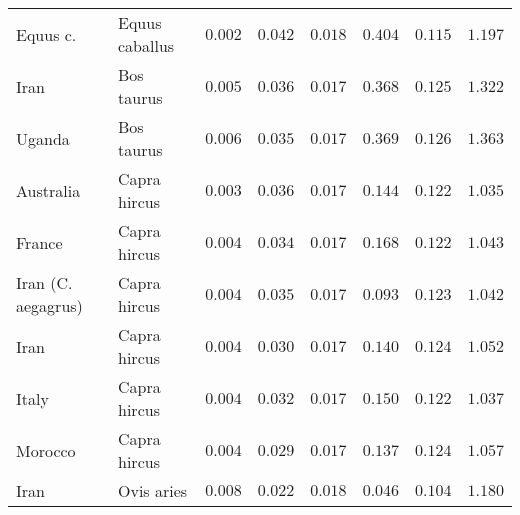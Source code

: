 \documentclass{article}
\begin{document}
\begin{center}
\begin{longtable}{|l|l|r|r|r|r|r|r|}
            \bottomrule
            \endlastfoot
            Equus c.             & Equus caballus      & $ 0.002$        & $ 0.042$                   & $ 0.018$                      & $ 0.404$                             & $ 0.115$                      & $ 1.197$           \\
            Iran                 & Bos taurus          & $ 0.005$        & $ 0.036$                   & $ 0.017$                      & $ 0.368$                             & $ 0.125$                      & $ 1.322$           \\
            Uganda               & Bos taurus          & $ 0.006$        & $ 0.035$                   & $ 0.017$                      & $ 0.369$                             & $ 0.126$                      & $ 1.363$           \\
            Australia            & Capra hircus        & $ 0.003$        & $ 0.036$                   & $ 0.017$                      & $ 0.144$                             & $ 0.122$                      & $ 1.035$           \\
            France               & Capra hircus        & $ 0.004$        & $ 0.034$                   & $ 0.017$                      & $ 0.168$                             & $ 0.122$                      & $ 1.043$           \\
            Iran (C. aegagrus)   & Capra hircus        & $ 0.004$        & $ 0.035$                   & $ 0.017$                      & $ 0.093$                             & $ 0.123$                      & $ 1.042$           \\
            Iran                 & Capra hircus        & $ 0.004$        & $ 0.030$                   & $ 0.017$                      & $ 0.140$                             & $ 0.124$                      & $ 1.052$           \\
            Italy                & Capra hircus        & $ 0.004$        & $ 0.032$                   & $ 0.017$                      & $ 0.150$                             & $ 0.122$                      & $ 1.037$           \\
            Morocco              & Capra hircus        & $ 0.004$        & $ 0.029$                   & $ 0.017$                      & $ 0.137$                             & $ 0.124$                      & $ 1.057$           \\
            Iran                 & Ovis aries          & $ 0.008$        & $ 0.022$                   & $ 0.018$                      & $ 0.046$                             & $ 0.104$                      & $ 1.180$           \\

\end{longtable}
\end{center}
\end{document}
